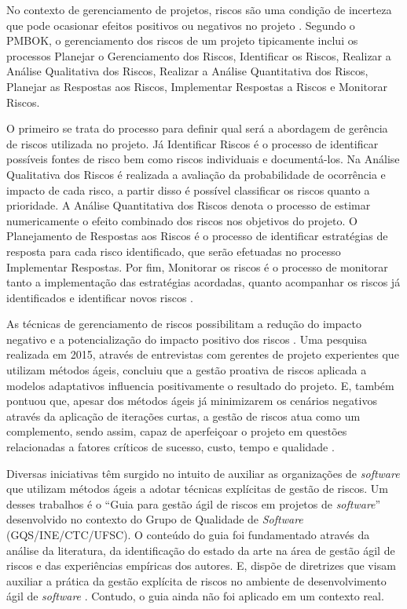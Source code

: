 \documentclass[
    12pt,       %
    openright,      %
    twoside,      %
    a4paper,      %
    english,      %
    french,       %
    spanish,      %
    brazil,       %
    ]{abntex2}
\begin{document}
No contexto de gerenciamento de projetos, riscos são uma condição de incerteza que pode ocasionar efeitos positivos ou negativos no projeto \cite{PMBOK:2017}. Segundo o PMBOK, o gerenciamento dos riscos de um projeto tipicamente inclui os processos Planejar o Gerenciamento dos Riscos, Identificar os Riscos, Realizar a Análise Qualitativa dos Riscos, Realizar a Análise Quantitativa dos Riscos, Planejar as Respostas aos Riscos, Implementar Respostas a Riscos e Monitorar Riscos. 

O primeiro se trata do processo para definir qual será a abordagem de gerência de riscos utilizada no projeto. Já Identificar Riscos é o processo de identificar possíveis fontes de risco bem como riscos individuais e documentá-los. Na Análise Qualitativa dos Riscos é realizada a avaliação da probabilidade de ocorrência e impacto de cada risco, a partir disso é possível classificar os riscos quanto a prioridade. A Análise Quantitativa dos Riscos denota o processo de estimar numericamente o efeito combinado dos riscos nos objetivos do projeto. O Planejamento de Respostas aos Riscos é o processo de identificar estratégias de resposta para cada risco identificado, que serão efetuadas no processo Implementar Respostas. Por fim, Monitorar os riscos é o processo de monitorar tanto a implementação das estratégias acordadas, quanto acompanhar os riscos já identificados e identificar novos riscos \cite{PMBOK:2017}.

As técnicas de gerenciamento de riscos possibilitam a redução do impacto negativo e a potencialização do impacto positivo dos riscos \cite{Milare:2019}. Uma pesquisa realizada em 2015, através de entrevistas com gerentes de projeto experientes que utilizam métodos ágeis, concluiu que a gestão proativa de riscos aplicada a modelos adaptativos influencia positivamente o resultado do projeto. E, também pontuou que, apesar dos métodos ágeis já minimizarem os cenários negativos através da aplicação de iterações curtas, a gestão de riscos atua como um complemento, sendo assim, capaz de aperfeiçoar o projeto em questões relacionadas a fatores críticos de sucesso, custo, tempo e qualidade \cite{Gold:2015}.

Diversas iniciativas têm surgido no intuito de auxiliar as organizações de \textit{software} que utilizam métodos ágeis a adotar técnicas explícitas de gestão de riscos. Um desses trabalhos é o “Guia para gestão ágil de riscos em projetos de \textit{software}” desenvolvido no contexto do Grupo de Qualidade de \textit{Software} (GQS/INE/CTC/UFSC). O conteúdo do guia foi fundamentado através da análise da literatura, da identificação do estado da arte na área de gestão ágil de riscos e das experiências empíricas dos autores. E, dispõe de diretrizes que visam auxiliar a prática da gestão explícita de riscos no ambiente de desenvolvimento ágil de \textit{software} \cite{Vieira:2020}. Contudo, o guia ainda não foi aplicado em um contexto real.
\end{document}
